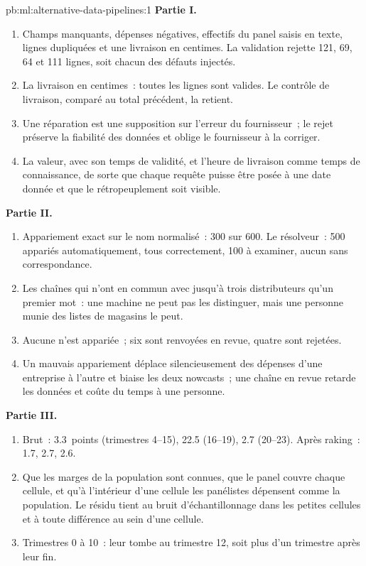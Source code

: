 \begin{solution}{pb:ml:alternative-data-pipelines:1}
\textbf{Partie I.}
\begin{enumerate}
\item Champs manquants, dépenses négatives, effectifs du panel saisis en texte, lignes dupliquées et une livraison en centimes. La validation rejette
121, 69, 64 et 111 lignes, soit chacun des défauts injectés.
\item La livraison en centimes~: toutes les lignes sont valides. Le contrôle de livraison, comparé au total précédent, la retient.
\item Une réparation est une supposition sur l'erreur du fournisseur~; le rejet préserve la fiabilité des données et oblige le fournisseur à la corriger.
\item La valeur, avec son temps de validité, et l'heure de livraison comme temps de connaissance, de sorte que chaque requête puisse être posée à une date donnée
et que le rétropeuplement soit visible.
\end{enumerate}
\textbf{Partie II.}
\begin{enumerate}[resume]
\item Appariement exact sur le nom normalisé~: 300 sur 600. Le résolveur~: 500 appariés automatiquement, tous correctement, 100 à
examiner, aucun sans correspondance.
\item Les chaînes qui n'ont en commun avec jusqu'à trois distributeurs qu'un premier mot~: une machine ne peut pas les distinguer, mais une personne
munie des listes de magasins le peut.
\item Aucune n'est appariée~; six sont renvoyées en revue, quatre sont rejetées.
\item Un mauvais appariement déplace silencieusement des dépenses d'une entreprise à l'autre et biaise les deux nowcasts~; une chaîne en revue retarde les données et
coûte du temps à une personne.
\end{enumerate}
\textbf{Partie III.}
\begin{enumerate}[resume]
\item Brut~: 3.3~points (trimestres 4--15), 22.5 (16--19), 2.7 (20--23). Après raking~: 1.7, 2.7, 2.6.
\item Que les marges de la population sont connues, que le panel couvre chaque cellule, et qu'à l'intérieur d'une cellule les panélistes dépensent comme
la population. Le résidu tient au bruit d'échantillonnage dans les petites cellules et à toute différence au sein d'une cellule.
\item Trimestres 0 à 10~: leur  tombe au trimestre 12, soit plus d'un trimestre après leur fin.

\end{enumerate}
\end{solution}
